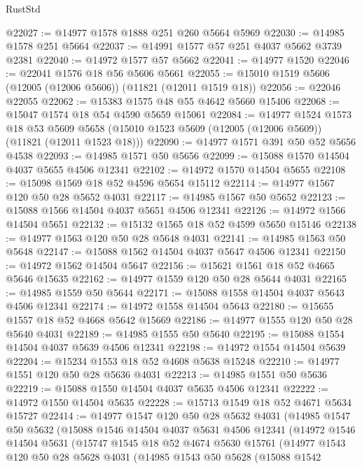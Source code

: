 \begin{lexlean}{RustStd}
\begin{coremodule}
@22027 := @14977 @1578 @1888 @251 @260 @5664 @5969
@22030 := @14985 @1578 @251 @5664
@22037 := @14991 @1577 @57 @251 @4037 @5662 @3739 @2381
@22040 := @14972 @1577 @57 @5662
@22041 := @14977 @1520
@22046 := @22041 @1576 @18 @56 @5606 @5661
@22055 := @15010 @1519 @5606 (@12005 (@12006 @5606)) (@11821 (@12011 @1519 @18))
@22056 := @22046 @22055
@22062 := @15383 @1575 @48 @55 @4642 @5660 @15406
@22068 := @15047 @1574 @18 @54 @4590 @5659 @15061
@22084 := @14977
    @1524
    @1573
    @18
    @53
    @5609
    @5658
    (@15010 @1523 @5609 (@12005 (@12006 @5609)) (@11821 (@12011 @1523 @18)))
@22090 := @14977 @1571 @391 @50 @52 @5656 @4538
@22093 := @14985 @1571 @50 @5656
@22099 := @15088 @1570 @14504 @4037 @5655 @4506 @12341
@22102 := @14972 @1570 @14504 @5655
@22108 := @15098 @1569 @18 @52 @4596 @5654 @15112
@22114 := @14977 @1567 @120 @50 @28 @5652 @4031
@22117 := @14985 @1567 @50 @5652
@22123 := @15088 @1566 @14504 @4037 @5651 @4506 @12341
@22126 := @14972 @1566 @14504 @5651
@22132 := @15132 @1565 @18 @52 @4599 @5650 @15146
@22138 := @14977 @1563 @120 @50 @28 @5648 @4031
@22141 := @14985 @1563 @50 @5648
@22147 := @15088 @1562 @14504 @4037 @5647 @4506 @12341
@22150 := @14972 @1562 @14504 @5647
@22156 := @15621 @1561 @18 @52 @4665 @5646 @15635
@22162 := @14977 @1559 @120 @50 @28 @5644 @4031
@22165 := @14985 @1559 @50 @5644
@22171 := @15088 @1558 @14504 @4037 @5643 @4506 @12341
@22174 := @14972 @1558 @14504 @5643
@22180 := @15655 @1557 @18 @52 @4668 @5642 @15669
@22186 := @14977 @1555 @120 @50 @28 @5640 @4031
@22189 := @14985 @1555 @50 @5640
@22195 := @15088 @1554 @14504 @4037 @5639 @4506 @12341
@22198 := @14972 @1554 @14504 @5639
@22204 := @15234 @1553 @18 @52 @4608 @5638 @15248
@22210 := @14977 @1551 @120 @50 @28 @5636 @4031
@22213 := @14985 @1551 @50 @5636
@22219 := @15088 @1550 @14504 @4037 @5635 @4506 @12341
@22222 := @14972 @1550 @14504 @5635
@22228 := @15713 @1549 @18 @52 @4671 @5634 @15727
@22414 := @14977
    @1547
    @120
    @50
    @28
    @5632
    @4031
    (@14985
      @1547
      @50
      @5632
      (@15088
        @1546
        @14504
        @4037
        @5631
        @4506
        @12341
        (@14972
          @1546
          @14504
          @5631
          (@15747
            @1545
            @18
            @52
            @4674
            @5630
            @15761
            (@14977
              @1543
              @120
              @50
              @28
              @5628
              @4031
              (@14985
                @1543
                @50
                @5628
                (@15088
                  @1542

\end{coremodule}
\end{lexlean}
